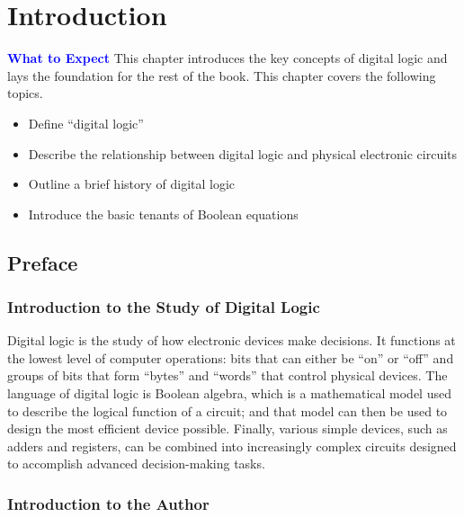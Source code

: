 \chapter{Introduction}\label{ch01}

\begin{tcolorbox}[colback=blue!5!white,colframe=blue!75!black]
	\textcolor{blue}{\textbf{What to Expect}}
	\tcblower
	This chapter introduces the key concepts of digital logic and lays the foundation for the rest of the book. This chapter covers the following topics.
	
	\begin{itemize}
		\item Define ``digital logic''
		\item Describe the relationship between digital logic and physical electronic circuits
		\item Outline a brief history of digital logic
		\item Introduce the basic tenants of Boolean equations
	\end{itemize}
\end{tcolorbox}

\section{Preface}
\subsection{Introduction to the Study of Digital Logic}

Digital logic is the study of how electronic devices make decisions. It functions at the lowest level of computer operations: bits that can either be ``on'' or ``off'' and groups of bits that form ``bytes'' and ``words'' that control physical devices. The language of digital logic is Boolean algebra, which is a mathematical model used to describe the logical function of a circuit; and that model can then be used to design the most efficient device possible. Finally, various simple devices, such as adders and registers, can be combined into increasingly complex circuits designed to accomplish advanced decision-making tasks.

\subsection{Introduction to the Author}

